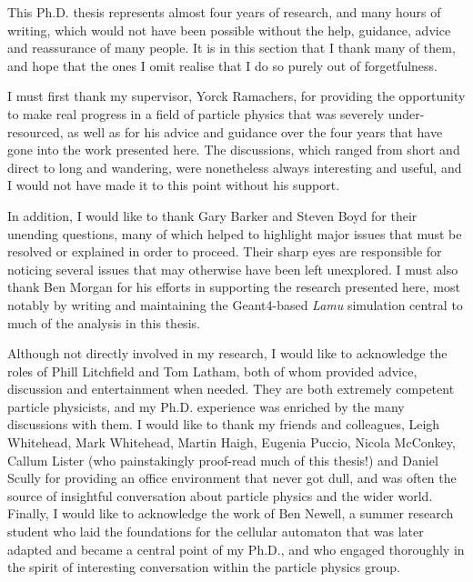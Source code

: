 This Ph.D. thesis represents almost four years of research, and many hours of writing, which would not have been possible without the help, guidance, advice and reassurance of many people. It is in this section that I thank many of them, and hope that the ones I omit realise that I do so purely out of forgetfulness.

I must first thank my supervisor, Yorck Ramachers, for providing the opportunity to make real progress in a field of particle physics that was severely under-resourced, as well as for his advice and guidance over the four years that have gone into the work presented here. The discussions, which ranged from short and direct to long and wandering, were nonetheless always interesting and useful, and I would not have made it to this point without his support.

In addition, I would like to thank Gary Barker and Steven Boyd for their unending questions, many of which helped to highlight major issues that must be resolved or explained in order to proceed. Their sharp eyes are responsible for noticing several issues that may otherwise have been left unexplored. I must also thank Ben Morgan for his efforts in supporting the research presented here, most notably by writing and maintaining the Geant4-based \emph{Lamu} simulation central to much of the analysis in this thesis.

Although not directly involved in my research, I would like to acknowledge the roles of Phill Litchfield and Tom Latham, both of whom provided advice, discussion and entertainment when needed. They are both extremely competent particle physicists, and my Ph.D. experience was enriched by the many discussions with them. I would like to thank my friends and colleagues, Leigh Whitehead, Mark Whitehead, Martin Haigh, Eugenia Puccio, Nicola McConkey, Callum Lister (who painstakingly proof-read much of this thesis!) and Daniel Scully for providing an office environment that never got dull, and was often the source of insightful conversation about particle physics and the wider world. Finally, I would like to acknowledge the work of Ben Newell, a summer research student who laid the foundations for the cellular automaton that was later adapted and became a central point of my Ph.D., and who engaged thoroughly in the spirit of interesting conversation within the particle physics group.
